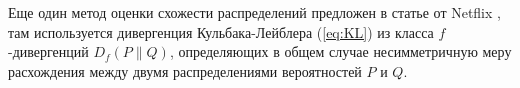   Еще один метод оценки схожести распределений предложен в статье от Netflix \cite{bib4}, 
  там используется дивергенция Кульбака-Лейблера (\ref{eq:KL}) из класса ${f}$-дивергенций ${\displaystyle D_{f}(P\parallel Q)}$,  определяющих в общем случае несимметричную меру расхождения между двумя распределениями вероятностей ${P}$ и ${Q}$.

